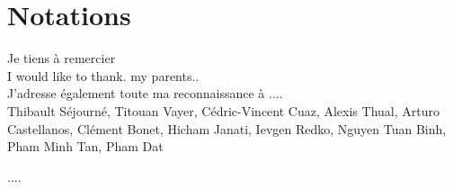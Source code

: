 \chapter*{Notations}


Je tiens à remercier  \\
I would like to thank. my parents..\\
J'adresse également toute ma reconnaissance à .... \\

Thibault Séjourné, Titouan Vayer, Cédric-Vincent Cuaz,
Alexis Thual,
Arturo Castellanos,
Clément Bonet,
Hicham Janati,
Ievgen Redko,
Nguyen Tuan Binh,
Pham Minh Tan,
Pham Dat



....
